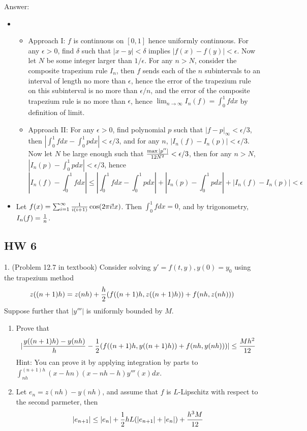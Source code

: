 \documentclass{article} %
\theoremstyle{break}
\begin{document}
Answer:
\begin{itemize}
\item \begin{itemize}
    \item Approach I: $f$ is continuous on $[0, 1]$ hence uniformly continuous. For any $\epsilon>0$, find $\delta$ such that $|x-y|<\delta$ implies $|f(x)-f(y)|<\epsilon$. Now let $N$ be some integer larger than $1/\epsilon$. For any $n>N$, consider the composite trapezium rule $I_n$, then $f$ sends each of the $n$ subintervals to an interval of length no more than $\epsilon$, hence the error of the trapezium rule on this subinterval is no more than $\epsilon/n$, and the error of the composite trapezium rule is no more than $\epsilon$, hence $\lim_{n\rightarrow\infty}I_n(f)=\int_0^1fdx$ by definition of limit.
    \item Approach II: For any $\epsilon>0$, find polynomial $p$ such that $|f-p|_\infty<\epsilon/3$, then $|\int_0^1fdx-\int_0^1pdx|<\epsilon/3$, and for any $n$, $|I_n(f)-I_n(p)|<\epsilon/3$. Now let $N$ be large enough such that ${\max|p''|\over 12N^2}<\epsilon/3$, then for any $n>N$, $|I_n(p)-\int_0^1pdx|<\epsilon/3$, hence
      \[|I_n(f)-\int_0^1fdx|\leq |\int_0^1fdx-\int_0^1pdx|+|I_n(p)-\int_0^1pdx|+|I_n(f)-I_n(p)|<\epsilon\]
   \end{itemize}
 \item Let $f(x)=\sum_{i=1}^\infty{1\over i(i+1)}\cos(2\pi i!x)$. Then $\int_0^1fdx=0$, and by trigonometry, $I_n(f)={1\over n}$. 
 \end{itemize}

 \subsection{HW 6}

 
1. (Problem 12.7 in textbook) Consider solving $y'=f(t, y), y(0)=y_0$ using the trapezium method
\[z((n+1)h)=z(nh)+{h\over 2}(f((n+1)h, z((n+1)h))+f(nh, z(nh)))\]
Suppose further that $|y'''|$ is uniformly bounded by $M$.
\begin{enumerate}
\item Prove that
  \[|{y((n+1)h)-y(nh)\over h}-{1\over 2}(f((n+1)h, y((n+1)h))+f(nh, y(nh)))|\leq {Mh^2\over 12}\]
  Hint: You can prove it by applying integration by parts to $\int_{nh}^{(n+1)h}(x-hn)(x-nh-h)y'''(x)dx$. 
\item Let $e_n=z(nh)-y(nh)$, and assume that $f$ is $L$-Lipschitz with respect to the second parmeter, then
  \[|e_{n+1}|\leq |e_n|+{1\over 2}hL(|e_{n+1}|+|e_n|)+{h^3M\over 12}\]
\end{enumerate}
\end{document}
